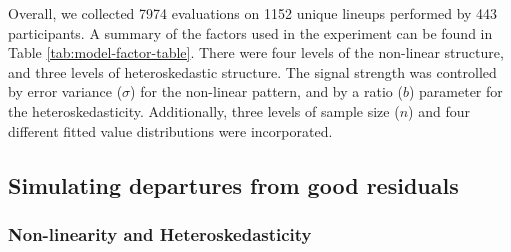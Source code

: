 \documentclass[]{interact}
\theoremstyle{plain}%
\theoremstyle{definition}
\theoremstyle{remark}
\begin{document}
Overall, we collected 7974 evaluations on 1152 unique lineups performed
by 443 participants. A summary of the factors used in the experiment can
be found in Table \ref{tab:model-factor-table}. There were four levels
of the non-linear structure, and three levels of heteroskedastic
structure. The signal strength was controlled by error variance
(\(\sigma\)) for the non-linear pattern, and by a ratio (\(b\))
parameter for the heteroskedasticity. Additionally, three levels of
sample size (\(n\)) and four different fitted value distributions were
incorporated.

\begin{table}

\caption{\label{tab:model-factor-table}Levels of the factors used in data collection periods I, II, and III.}
\centering
{}
\end{table}

\hypertarget{simulating-departures-from-good-residuals}{%
\subsection{Simulating departures from good
residuals}\label{simulating-departures-from-good-residuals}}

\hypertarget{non-linearity-and-heteroskedasticity}{%
\subsubsection{Non-linearity and
Heteroskedasticity}\label{non-linearity-and-heteroskedasticity}}
\end{document}
